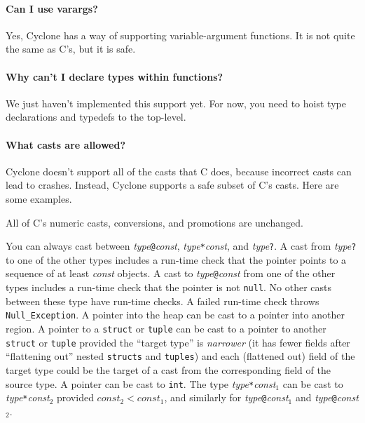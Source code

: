 \paragraph{Can I use varargs?}

Yes, Cyclone has a way of supporting variable-argument functions.  It
is not quite the same as C's, but it is safe.

\paragraph{Why can't I declare types within functions?}

We just haven't implemented this support yet.  For now, you need to
hoist type declarations and typedefs to the top-level.

\paragraph{What casts are allowed?}

Cyclone doesn't support all of the casts that C does, because
incorrect casts can lead to crashes.  Instead, Cyclone supports a safe
subset of C's casts.  Here are some examples.

All of C's numeric casts, conversions, and promotions are unchanged.

You can always cast between
\textit{type}\texttt{@}\lb\textit{const}\rb,
\textit{type}\texttt{*}\lb\textit{const}\rb, and
\textit{type}\texttt{?}.
A cast from 
\textit{type}\texttt{?}
to one of the other types includes a run-time check that the pointer
points to a sequence of at least \textit{const} objects.
A cast to
\textit{type}\texttt{@}\lb\textit{const}\rb
from one of the
other types includes a run-time check that the pointer is not
\texttt{null}.
No other casts between these type have run-time checks.
A failed run-time check throws \texttt{Null_Exception}.
A pointer into the heap can be cast to a pointer into another region.
A pointer to a \texttt{struct} or \texttt{tuple} can be
cast to a pointer to another \texttt{struct} or \texttt{tuple}
provided the ``target type'' 
is \emph{narrower} (it has fewer fields after ``flattening out'' nested
\texttt{structs} and \texttt{tuples}) and each (flattened out) field
of the target type could be the target of a cast from the
corresponding field of the source type.
A pointer can be cast to \texttt{int}.
The type
\textit{type}\texttt{*}\lb\textit{const}$_1$\rb
can be cast to
\textit{type}\texttt{*}\lb\textit{const}$_2$\rb
provided
$\textit{const}_2 < \textit{const}_1$, and similarly for
\textit{type}\texttt{@}\lb\textit{const}$_1$\rb
and
\textit{type}\texttt{@}\lb\textit{const}$_2$\rb.


